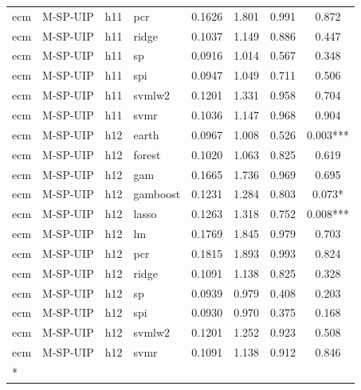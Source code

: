 \begin{ThreePartTable}
\begin{longtable}[t]{llclcccc}
ecm & M-SP-UIP & h11 & pcr & 0.1626 & 1.801 & 0.991 & 0.872\\
ecm & M-SP-UIP & h11 & ridge & 0.1037 & 1.149 & 0.886 & 0.447\\
ecm & M-SP-UIP & h11 & sp & 0.0916 & 1.014 & 0.567 & 0.348\\
ecm & M-SP-UIP & h11 & spi & 0.0947 & 1.049 & 0.711 & 0.506\\
ecm & M-SP-UIP & h11 & svmlw2 & 0.1201 & 1.331 & 0.958 & 0.704\\
ecm & M-SP-UIP & h11 & svmr & 0.1036 & 1.147 & 0.968 & 0.904\\
\addlinespace
ecm & M-SP-UIP & h12 & earth & 0.0967 & 1.008 & 0.526 & 0.003***\\
ecm & M-SP-UIP & h12 & forest & 0.1020 & 1.063 & 0.825 & 0.619\\
ecm & M-SP-UIP & h12 & gam & 0.1665 & 1.736 & 0.969 & 0.695\\
ecm & M-SP-UIP & h12 & gamboost & 0.1231 & 1.284 & 0.803 & 0.073*\\
ecm & M-SP-UIP & h12 & lasso & 0.1263 & 1.318 & 0.752 & 0.008***\\
ecm & M-SP-UIP & h12 & lm & 0.1769 & 1.845 & 0.979 & 0.703\\
ecm & M-SP-UIP & h12 & pcr & 0.1815 & 1.893 & 0.993 & 0.824\\
ecm & M-SP-UIP & h12 & ridge & 0.1091 & 1.138 & 0.825 & 0.328\\
ecm & M-SP-UIP & h12 & sp & 0.0939 & 0.979 & 0.408 & 0.203\\
ecm & M-SP-UIP & h12 & spi & 0.0930 & 0.970 & 0.375 & 0.168\\
ecm & M-SP-UIP & h12 & svmlw2 & 0.1201 & 1.252 & 0.923 & 0.508\\
ecm & M-SP-UIP & h12 & svmr & 0.1091 & 1.138 & 0.912 & 0.846\\*
\end{longtable}
\end{ThreePartTable}
\endgroup{}
